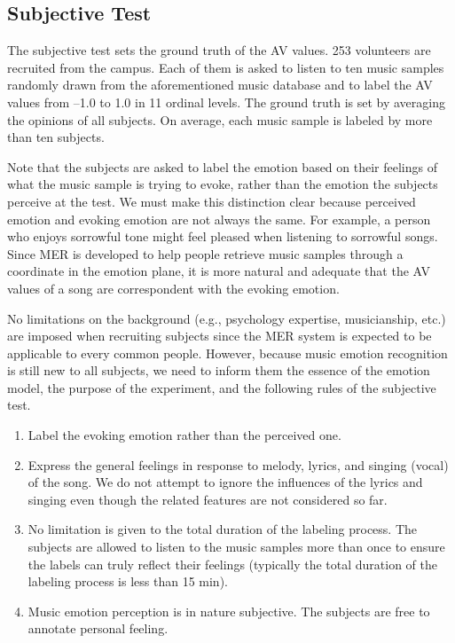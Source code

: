 \documentclass[journal, twoside]{IEEEtran}
\begin{document}
\subsection{Subjective Test}
The subjective test sets the ground truth of the AV values. 253 volunteers are recruited from the campus. Each of them is asked to listen to ten music samples randomly drawn from the aforementioned music database and to label the AV values from –1.0 to 1.0 in 11 ordinal levels. The ground truth is set by averaging the opinions of all subjects. On average, each music sample is labeled by more than ten subjects.

Note that the subjects are asked to label the emotion based on their feelings of what the music sample is trying to evoke, rather than the emotion the subjects perceive at the test. We must make this distinction clear because perceived emotion and evoking emotion are not always the same. For example, a person who enjoys sorrowful tone might feel pleased when listening to sorrowful songs. Since MER is developed to help people retrieve music samples through a coordinate in the emotion plane, it is more natural and adequate that the AV values of a song are correspondent with the evoking emotion.

No limitations on the background (e.g., psychology expertise, musicianship, etc.) are imposed when recruiting subjects since the MER system is expected to be applicable to every common people. However, because music emotion recognition is still new to all subjects, we need to inform them the essence of the emotion model, the purpose of the experiment, and the
following rules of the subjective test.
\begin{enumerate}
    \item Label the evoking emotion rather than the perceived one.
    \item Express the general feelings in response to melody, lyrics, and singing (vocal) of the song. We do not attempt to ignore the influences of the lyrics and singing even though the related features are not considered so far.
    \item No limitation is given to the total duration of the labeling process. The subjects are allowed to listen to the music samples more than once to ensure the labels can truly reflect their feelings (typically the total duration of the labeling process is less than 15 min).
    \item Music emotion perception is in nature subjective. The subjects are free to annotate personal feeling.
\end{enumerate}
\end{document}
